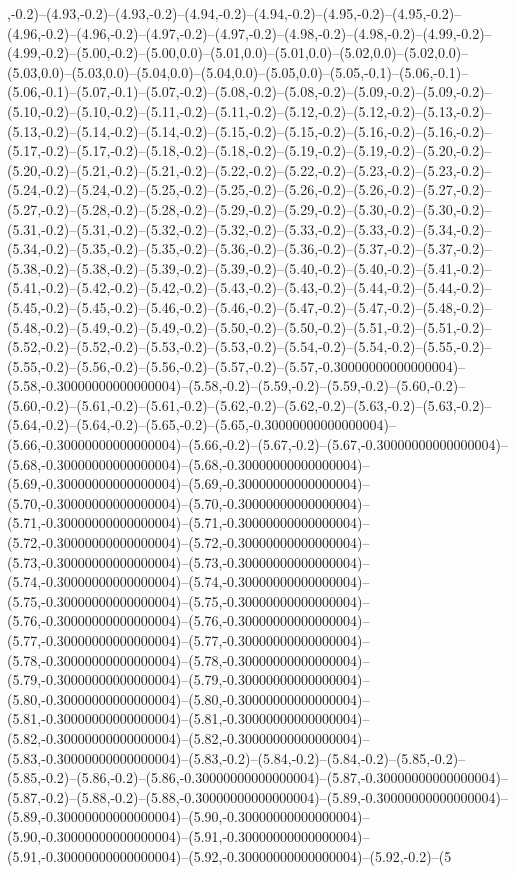,-0.2)--(4.93,-0.2)--(4.93,-0.2)--(4.94,-0.2)--(4.94,-0.2)--(4.95,-0.2)--(4.95,-0.2)--(4.96,-0.2)--(4.96,-0.2)--(4.97,-0.2)--(4.97,-0.2)--(4.98,-0.2)--(4.98,-0.2)--(4.99,-0.2)--(4.99,-0.2)--(5.00,-0.2)--(5.00,0.0)--(5.01,0.0)--(5.01,0.0)--(5.02,0.0)--(5.02,0.0)--(5.03,0.0)--(5.03,0.0)--(5.04,0.0)--(5.04,0.0)--(5.05,0.0)--(5.05,-0.1)--(5.06,-0.1)--(5.06,-0.1)--(5.07,-0.1)--(5.07,-0.2)--(5.08,-0.2)--(5.08,-0.2)--(5.09,-0.2)--(5.09,-0.2)--(5.10,-0.2)--(5.10,-0.2)--(5.11,-0.2)--(5.11,-0.2)--(5.12,-0.2)--(5.12,-0.2)--(5.13,-0.2)--(5.13,-0.2)--(5.14,-0.2)--(5.14,-0.2)--(5.15,-0.2)--(5.15,-0.2)--(5.16,-0.2)--(5.16,-0.2)--(5.17,-0.2)--(5.17,-0.2)--(5.18,-0.2)--(5.18,-0.2)--(5.19,-0.2)--(5.19,-0.2)--(5.20,-0.2)--(5.20,-0.2)--(5.21,-0.2)--(5.21,-0.2)--(5.22,-0.2)--(5.22,-0.2)--(5.23,-0.2)--(5.23,-0.2)--(5.24,-0.2)--(5.24,-0.2)--(5.25,-0.2)--(5.25,-0.2)--(5.26,-0.2)--(5.26,-0.2)--(5.27,-0.2)--(5.27,-0.2)--(5.28,-0.2)--(5.28,-0.2)--(5.29,-0.2)--(5.29,-0.2)--(5.30,-0.2)--(5.30,-0.2)--(5.31,-0.2)--(5.31,-0.2)--(5.32,-0.2)--(5.32,-0.2)--(5.33,-0.2)--(5.33,-0.2)--(5.34,-0.2)--(5.34,-0.2)--(5.35,-0.2)--(5.35,-0.2)--(5.36,-0.2)--(5.36,-0.2)--(5.37,-0.2)--(5.37,-0.2)--(5.38,-0.2)--(5.38,-0.2)--(5.39,-0.2)--(5.39,-0.2)--(5.40,-0.2)--(5.40,-0.2)--(5.41,-0.2)--(5.41,-0.2)--(5.42,-0.2)--(5.42,-0.2)--(5.43,-0.2)--(5.43,-0.2)--(5.44,-0.2)--(5.44,-0.2)--(5.45,-0.2)--(5.45,-0.2)--(5.46,-0.2)--(5.46,-0.2)--(5.47,-0.2)--(5.47,-0.2)--(5.48,-0.2)--(5.48,-0.2)--(5.49,-0.2)--(5.49,-0.2)--(5.50,-0.2)--(5.50,-0.2)--(5.51,-0.2)--(5.51,-0.2)--(5.52,-0.2)--(5.52,-0.2)--(5.53,-0.2)--(5.53,-0.2)--(5.54,-0.2)--(5.54,-0.2)--(5.55,-0.2)--(5.55,-0.2)--(5.56,-0.2)--(5.56,-0.2)--(5.57,-0.2)--(5.57,-0.30000000000000004)--(5.58,-0.30000000000000004)--(5.58,-0.2)--(5.59,-0.2)--(5.59,-0.2)--(5.60,-0.2)--(5.60,-0.2)--(5.61,-0.2)--(5.61,-0.2)--(5.62,-0.2)--(5.62,-0.2)--(5.63,-0.2)--(5.63,-0.2)--(5.64,-0.2)--(5.64,-0.2)--(5.65,-0.2)--(5.65,-0.30000000000000004)--(5.66,-0.30000000000000004)--(5.66,-0.2)--(5.67,-0.2)--(5.67,-0.30000000000000004)--(5.68,-0.30000000000000004)--(5.68,-0.30000000000000004)--(5.69,-0.30000000000000004)--(5.69,-0.30000000000000004)--(5.70,-0.30000000000000004)--(5.70,-0.30000000000000004)--(5.71,-0.30000000000000004)--(5.71,-0.30000000000000004)--(5.72,-0.30000000000000004)--(5.72,-0.30000000000000004)--(5.73,-0.30000000000000004)--(5.73,-0.30000000000000004)--(5.74,-0.30000000000000004)--(5.74,-0.30000000000000004)--(5.75,-0.30000000000000004)--(5.75,-0.30000000000000004)--(5.76,-0.30000000000000004)--(5.76,-0.30000000000000004)--(5.77,-0.30000000000000004)--(5.77,-0.30000000000000004)--(5.78,-0.30000000000000004)--(5.78,-0.30000000000000004)--(5.79,-0.30000000000000004)--(5.79,-0.30000000000000004)--(5.80,-0.30000000000000004)--(5.80,-0.30000000000000004)--(5.81,-0.30000000000000004)--(5.81,-0.30000000000000004)--(5.82,-0.30000000000000004)--(5.82,-0.30000000000000004)--(5.83,-0.30000000000000004)--(5.83,-0.2)--(5.84,-0.2)--(5.84,-0.2)--(5.85,-0.2)--(5.85,-0.2)--(5.86,-0.2)--(5.86,-0.30000000000000004)--(5.87,-0.30000000000000004)--(5.87,-0.2)--(5.88,-0.2)--(5.88,-0.30000000000000004)--(5.89,-0.30000000000000004)--(5.89,-0.30000000000000004)--(5.90,-0.30000000000000004)--(5.90,-0.30000000000000004)--(5.91,-0.30000000000000004)--(5.91,-0.30000000000000004)--(5.92,-0.30000000000000004)--(5.92,-0.2)--(5